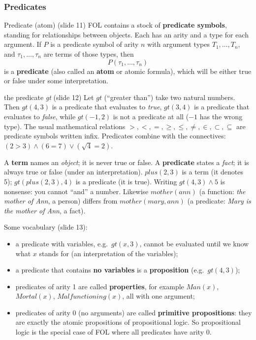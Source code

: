 \subsubsection{Predicates}

\begin{nbdef}{Predicate (atom) (slide 11)}
FOL contains a stock of \textbf{predicate symbols}, standing for relationships between
objects. Each has an arity and a type for each argument. If $P$ is a predicate symbol of
arity $n$ with argument types $T_1, \ldots, T_n$, and $\tau_1, \ldots, \tau_n$ are terms of
those types, then
\[ P(\tau_1, \ldots, \tau_n) \]
is a \textbf{predicate} (also called an \textbf{atom} or atomic formula), which will be
either true or false under some interpretation.
\end{nbdef}

\begin{nbexample}{the predicate \emph{gt} (slide 12)}
Let $\mathit{gt}$ (``greater than'') take two natural numbers. Then $\mathit{gt}(4,3)$ is a
predicate that evaluates to \emph{true}, $\mathit{gt}(3,4)$ is a predicate that evaluates to
\emph{false}, while $\mathit{gt}(-1, 2)$ is not a predicate at all ($-1$ has the wrong
type). The usual mathematical relations $>, <, =, \geq, \leq, \neq, \in, \subset,
\subseteq$ are predicate symbols written infix. Predicates combine with the connectives:
$(2 > 3) \land (6 = 7) \lor (\sqrt 4 = 2)$.
\end{nbexample}

\begin{nbwarning}
A \textbf{term} names an \emph{object}; it is never true or false. A \textbf{predicate}
states a \emph{fact}; it is always true or false (under an interpretation).
$\mathit{plus}(2,3)$ is a term (it denotes 5); $\mathit{gt}(\mathit{plus}(2,3), 4)$ is a
predicate (it is true). Writing $\mathit{gt}(4,3) \land 5$ is nonsense: you cannot ``and''
a number. Likewise $\mathit{mother}(\mathit{ann})$ (a function: \emph{the mother of Ann}, a
person) differs from $\mathit{mother}(\mathit{mary}, \mathit{ann})$ (a predicate:
\emph{Mary is the mother of Ann}, a fact).
\end{nbwarning}

Some vocabulary (slide 13):
\begin{itemize}[nosep]
  \item a predicate with variables, e.g.\ $\mathit{gt}(x, 3)$, cannot be evaluated until we
        know what $x$ stands for (an interpretation of the variables);
  \item a predicate that contains \textbf{no variables} is a \textbf{proposition}
        (e.g.\ $\mathit{gt}(4,3)$);
  \item predicates of arity 1 are called \textbf{properties}, for example
        $\mathit{Man}(x)$, $\mathit{Mortal}(x)$,
        $\mathit{Malfunctioning}(x)$, all with one argument;
  \item predicates of arity 0 (no arguments) are called \textbf{primitive propositions}:
        they are exactly the atomic propositions of propositional logic. So propositional
        logic is the special case of FOL where all predicates have arity 0.
\end{itemize}

